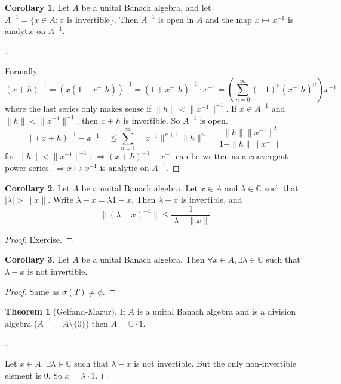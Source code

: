 \documentclass{article}
\theoremstyle{definition}
\newtheorem{thm}{Theorem}
\newtheorem{cor}{Corollary}
\newenvironment{proofs}[1][\proofname]{%
  \begin{proof}[#1]$ $\par\nobreak\ignorespaces
}{%
  \end{proof}
}
\newcommand{\CC}{\mathbb C}
\newcommand{\Ra}{\Rightarrow}
\begin{document}
\begin{cor}
	Let $A$ be a unital Banach algebra, and let $A^{-1} = \{x \in A: x \text{ is invertible}\}$.
	Then $A^{-1}$ is open in $A$ and the map $x \mapsto x^{-1}$ is analytic on $A^{-1}$.
\end{cor}

\begin{proofs}
	Formally, 
	\[
		(x + h)^{-1} = (x (1 + x^{-1} h))^{-1} = (1 + x^{-1} h)^{-1} \cdot x^{-1} = \left( \sum_{n = 0}^\infty (-1)^n (x^{-1} h)^n \right) x^{-1}
	\]
	where the last series only makes sense if $\|h\| < \|x^{-1}\|^{-1}$.
	If $x \in A^{-1}$ and $\|h\| < \|x^{-1}\|^{-1}$, then $x + h$ is invertible.
	So $A^{-1}$ is open.
	\[
		\|(x + h)^{-1} - x^{-1}\| \leq \sum_{n = 1}^\infty \|x^{-1}\|^{n + 1} \|h\|^n = \frac{\|h\| \|x^{-1}\|^2}{1 - \|h\|\|x^{-1}\|}\
	\]
	for $\|h\| < \|x^{-1}\|^{-1}$.
	$\Ra (x + h)^{-1} - x^{-1}$ can be written as a convergent power series.
	$\Ra x \mapsto x^{-1}$ is analytic on $A^{-1}$.
\end{proofs}

\begin{cor}
	Let $A$ be a unital Banach algebra.
	Let $x \in A$ and $\lambda \in \CC$ such that $|\lambda| > \|x\|$.
	Write $\lambda - x = \lambda 1 - x$.
	Then $\lambda - x$ is invertible, and
	\[
		\|(\lambda - x)^{-1}\| \leq \frac{1}{|\lambda| - \|x\|}
	\]
\end{cor}

\begin{proof}
	Exercise.
\end{proof}

\begin{cor}
	Let $A$ be a unital Banach algebra.
	Then $\forall x \in A, \exists \lambda \in \CC$ such that $\lambda - x$ is not invertible.
\end{cor}

\begin{proof}
	Same as $\sigma(T) \neq \phi$.
\end{proof}

\begin{thm}[Gelfand-Mazur]
	If $A$ is a unital Banach algebra and is a division algebra ($A^{-1} = A \setminus \{0\}$) then $A = \CC \cdot 1$.
\end{thm}

\begin{proofs}
	Let $x \in A$.
	$\exists \lambda \in \CC$ such that $\lambda - x$ is not invertible.
	But the only non-invertible element is 0.
	So $x = \lambda \cdot 1$.
\end{proofs}
\end{document}
